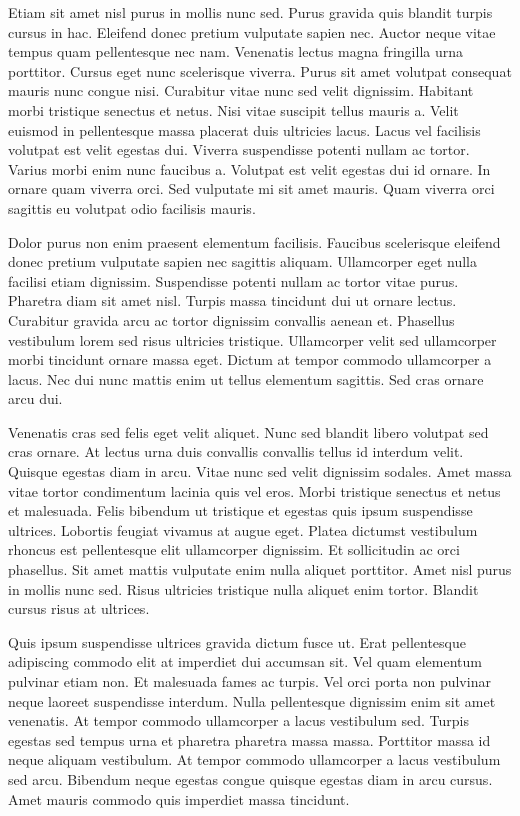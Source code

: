 \documentclass[11pt,a4paper]{article}
\begin{document}
Etiam sit amet nisl purus in mollis nunc sed. Purus gravida quis blandit turpis cursus in hac. Eleifend donec pretium vulputate sapien nec. Auctor neque vitae tempus quam pellentesque nec nam. Venenatis lectus magna fringilla urna porttitor. Cursus eget nunc scelerisque viverra. Purus sit amet volutpat consequat mauris nunc congue nisi. Curabitur vitae nunc sed velit dignissim. Habitant morbi tristique senectus et netus. Nisi vitae suscipit tellus mauris a. Velit euismod in pellentesque massa placerat duis ultricies lacus. Lacus vel facilisis volutpat est velit egestas dui. Viverra suspendisse potenti nullam ac tortor. Varius morbi enim nunc faucibus a. Volutpat est velit egestas dui id ornare. In ornare quam viverra orci. Sed vulputate mi sit amet mauris. Quam viverra orci sagittis eu volutpat odio facilisis mauris.

Dolor purus non enim praesent elementum facilisis. Faucibus scelerisque eleifend donec pretium vulputate sapien nec sagittis aliquam. Ullamcorper eget nulla facilisi etiam dignissim. Suspendisse potenti nullam ac tortor vitae purus. Pharetra diam sit amet nisl. Turpis massa tincidunt dui ut ornare lectus. Curabitur gravida arcu ac tortor dignissim convallis aenean et. Phasellus vestibulum lorem sed risus ultricies tristique. Ullamcorper velit sed ullamcorper morbi tincidunt ornare massa eget. Dictum at tempor commodo ullamcorper a lacus. Nec dui nunc mattis enim ut tellus elementum sagittis. Sed cras ornare arcu dui.

Venenatis cras sed felis eget velit aliquet. Nunc sed blandit libero volutpat sed cras ornare. At lectus urna duis convallis convallis tellus id interdum velit. Quisque egestas diam in arcu. Vitae nunc sed velit dignissim sodales. Amet massa vitae tortor condimentum lacinia quis vel eros. Morbi tristique senectus et netus et malesuada. Felis bibendum ut tristique et egestas quis ipsum suspendisse ultrices. Lobortis feugiat vivamus at augue eget. Platea dictumst vestibulum rhoncus est pellentesque elit ullamcorper dignissim. Et sollicitudin ac orci phasellus. Sit amet mattis vulputate enim nulla aliquet porttitor. Amet nisl purus in mollis nunc sed. Risus ultricies tristique nulla aliquet enim tortor. Blandit cursus risus at ultrices.

Quis ipsum suspendisse ultrices gravida dictum fusce ut. Erat pellentesque adipiscing commodo elit at imperdiet dui accumsan sit. Vel quam elementum pulvinar etiam non. Et malesuada fames ac turpis. Vel orci porta non pulvinar neque laoreet suspendisse interdum. Nulla pellentesque dignissim enim sit amet venenatis. At tempor commodo ullamcorper a lacus vestibulum sed. Turpis egestas sed tempus urna et pharetra pharetra massa massa. Porttitor massa id neque aliquam vestibulum. At tempor commodo ullamcorper a lacus vestibulum sed arcu. Bibendum neque egestas congue quisque egestas diam in arcu cursus. Amet mauris commodo quis imperdiet massa tincidunt.
\end{document}
